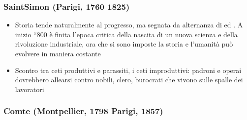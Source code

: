 \documentclass[letterpaper,10pt,italian]{jupyterBook}
\begin{document}
\sphinxAtStartPar
{}

\label{\detokenize{ch/history:pc-saint-simon}}\subsubsection*{Saint\sphinxhyphen{}Simon (Parigi, 1760 \sphinxhyphen{} 1825)}

\sphinxAtStartPar
{}
\begin{itemize}
\item {} 
\sphinxAtStartPar
Storia tende naturalmente al progresso, ma segnata da alternanza di  ed . A inizio “800 è finita l’epoca critica della nascita di un nuova scienza e della rivoluzione industriale, ora che si sono imposte la storia e l’umanità può evolvere in maniera costante

\item {} 
\sphinxAtStartPar
Scontro tra ceti produttivi e parassiti, i ceti improduttivi: padroni e operai dovrebbero allearsi contro nobili, clero, burocrati che vivono sulle spalle dei lavoratori

\end{itemize}
\label{\detokenize{ch/history:pc-comte}}\subsubsection*{Comte (Montpellier, 1798 \sphinxhyphen{} Parigi, 1857)}
\end{document}
